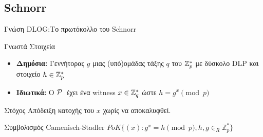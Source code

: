 \documentclass[10pt,handout]{beamer}
\begin{document}
\subsection{Schnorr}
\begin{frame}[allowframebreaks]{Γνώση DLOG:Το πρωτόκολλο του Schnorr}
\begin{block}{Γνωστά Στοιχεία}
\begin{itemize}
\item \textbf{Δημόσια:} Γεννήτορας $g$ μιας (υπό)ομάδας τάξης $q$ του $\mathbb{Z}^*_{p}$ με δύσκολο DLP και στοιχείο $h \in \mathbb{Z}^*_{p}$ 
\item \textbf{Ιδιωτικά:} O $\mathcal{P}\,$ έχει ένα witness $x \in \mathbb{Z}^*_{q}$ ώστε $h = g^x \pmod{p}$
\end{itemize}
\end{block}

\begin{block}{Στόχος}
Απόδειξη κατοχής του $x$ χωρίς να αποκαλυφθεί.
\end{block}

\begin{block}{Συμβολισμός Camenisch-Stadler}
$PoK \{(x): g^x = h \pmod{p}, h,g \in_R \mathbb{Z}_p^* \}$ 
\end{block}

\framebreak


\end{frame}
\end{document}
